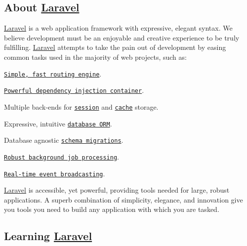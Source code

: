 

\href{https://travis-ci.org/laravel/framework}{\tt } \href{https://packagist.org/packages/laravel/framework}{\tt } \href{https://packagist.org/packages/laravel/framework}{\tt } \href{https://packagist.org/packages/laravel/framework}{\tt } 

\subsection*{About \mbox{\hyperlink{namespace_laravel}{Laravel}}}

\mbox{\hyperlink{namespace_laravel}{Laravel}} is a web application framework with expressive, elegant syntax. We believe development must be an enjoyable and creative experience to be truly fulfilling. \mbox{\hyperlink{namespace_laravel}{Laravel}} attempts to take the pain out of development by easing common tasks used in the majority of web projects, such as\+:


\begin{DoxyItemize}
\item \href{https://laravel.com/docs/routing}{\tt Simple, fast routing engine}.
\item \href{https://laravel.com/docs/container}{\tt Powerful dependency injection container}.
\item Multiple back-\/ends for \href{https://laravel.com/docs/session}{\tt session} and \href{https://laravel.com/docs/cache}{\tt cache} storage.
\item Expressive, intuitive \href{https://laravel.com/docs/eloquent}{\tt database O\+RM}.
\item Database agnostic \href{https://laravel.com/docs/migrations}{\tt schema migrations}.
\item \href{https://laravel.com/docs/queues}{\tt Robust background job processing}.
\item \href{https://laravel.com/docs/broadcasting}{\tt Real-\/time event broadcasting}.
\end{DoxyItemize}

\mbox{\hyperlink{namespace_laravel}{Laravel}} is accessible, yet powerful, providing tools needed for large, robust applications. A superb combination of simplicity, elegance, and innovation give you tools you need to build any application with which you are tasked.

\subsection*{Learning \mbox{\hyperlink{namespace_laravel}{Laravel}}}

